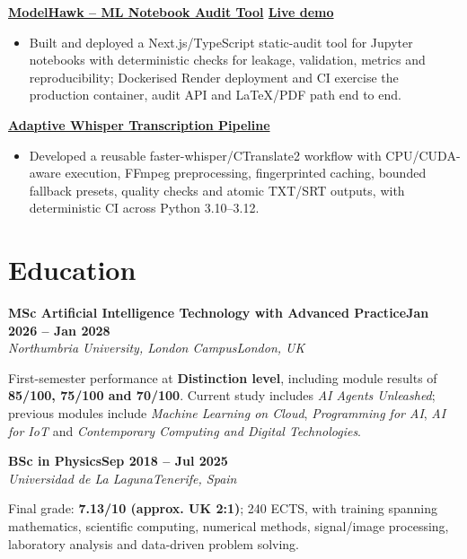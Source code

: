 \documentclass[10pt,a4paper]{article}
\newcommand{\entry}[4]{%
  \needspace{4\baselineskip}%
  \textbf{#1}\hfill\textbf{#2}\\[-0.08em]
  \textit{#3}\hfill\textit{#4}\par\nopagebreak
  \vspace{0.10em}
}
\newcommand{\project}[1]{%
  \needspace{3\baselineskip}%
  \textbf{#1}\par\nopagebreak
  \vspace{0.06em}
}
\begin{document}
\project{\href{https://github.com/albertoreyescastro/ModelHawk}{ModelHawk -- ML Notebook Audit Tool}\textmd{ \textbar{} \href{https://modelhawk.onrender.com}{Live demo}}}
\begin{itemize}
  \item Built and deployed a Next.js/TypeScript static-audit tool for Jupyter notebooks with deterministic checks for leakage, validation, metrics and reproducibility; Dockerised Render deployment and CI exercise the production container, audit API and LaTeX/PDF path end to end.
\end{itemize}

\project{\href{https://github.com/albertoreyescastro/adaptive-whisper-transcription-pipeline}{Adaptive Whisper Transcription Pipeline}}
\begin{itemize}
  \item Developed a reusable faster-whisper/CTranslate2 workflow with CPU/CUDA-aware execution, FFmpeg preprocessing, fingerprinted caching, bounded fallback presets, quality checks and atomic TXT/SRT outputs, with deterministic CI across Python 3.10--3.12.
\end{itemize}

\newpage
\titlespacing*{\section}{0pt}{1.05em}{0.46em}
\section{Education}

\entry
{MSc Artificial Intelligence Technology with Advanced Practice}
{Jan 2026 -- Jan 2028}
{Northumbria University, London Campus}
{London, UK}

First-semester performance at \textbf{Distinction level}, including module results of \textbf{85/100, 75/100 and 70/100}. Current study includes \textit{AI Agents Unleashed}; previous modules include \textit{Machine Learning on Cloud}, \textit{Programming for AI}, \textit{AI for IoT} and \textit{Contemporary Computing and Digital Technologies}.

\vspace{0.3cm}

\entry
{BSc in Physics}
{Sep 2018 -- Jul 2025}
{Universidad de La Laguna}
{Tenerife, Spain}

Final grade: \textbf{7.13/10 (approx. UK 2:1)}; 240 ECTS, with training spanning mathematics, scientific computing, numerical methods, signal/image processing, laboratory analysis and data-driven problem solving.
\end{document}
